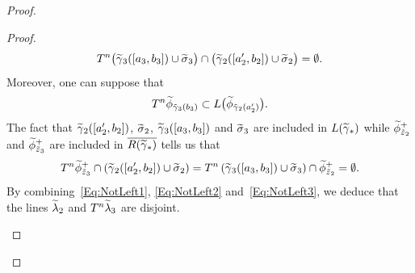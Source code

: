 \documentclass[10pt,a4paper]{article}
\theoremstyle{definition}
\theoremstyle{plain}
\numberwithin{equation}{section}
\numberwithin{figure}{section}
\let\oldtilde\tilde
\renewcommand*{\tilde}[1]{\mathchoice{\widetilde{#1}}{\widetilde{#1}}{\oldtilde{#1}}{\oldtilde{#1}}}
\begin{document}
\begin{proof}
\begin{proof}
\begin{equation}\label{Eq:NotLeft2}
T^n\big(\tilde\gamma_3([a_3,b_3])\cup \tilde\sigma_3\big)\cap \big(\tilde\gamma_2([a'_2,b_2])\cup \tilde\sigma_2\big)=\emptyset.
\end{equation}
Moreover, one can suppose that
\[
T^n\tilde \phi_{\tilde\gamma_3(b_3)}\subset L\big(\tilde\phi_{\tilde\gamma_2(a'_2)}\big).
\]
The fact that $\tilde \gamma_2([a'_2,b_2])$, $\tilde \sigma_2$, $\tilde \gamma_3([a_3,b_3])$ and $\tilde \sigma_3$ are included in $L(\tilde\gamma_*)$ while $\tilde \phi^+_{\tilde z_2}$ and $\tilde \phi^+_{\tilde z_3}$ are included in $\overline {R(\tilde\gamma_*)}$ tells us that
\begin{equation}\label{Eq:NotLeft3}
T^n\tilde \phi^+_{\tilde z_3}\cap \left(\tilde\gamma_2([a'_2,b_2])\cup \tilde\sigma_2\right)= T^n\left(\tilde\gamma_3([a_3,b_3])\cup \tilde\sigma_3\right)\cap \tilde \phi^+_{\tilde z_2}=\emptyset.
\end{equation}
By combining~\eqref{Eq:NotLeft1}, \eqref{Eq:NotLeft2} and~\eqref{Eq:NotLeft3}, we deduce that the lines $\tilde\lambda_2$ and $T^n\tilde\lambda_3$ are disjoint.


\begin{figure}
\begin{center}
\end{center}
\end{figure}
\end{proof}
\end{proof}
\end{document}
